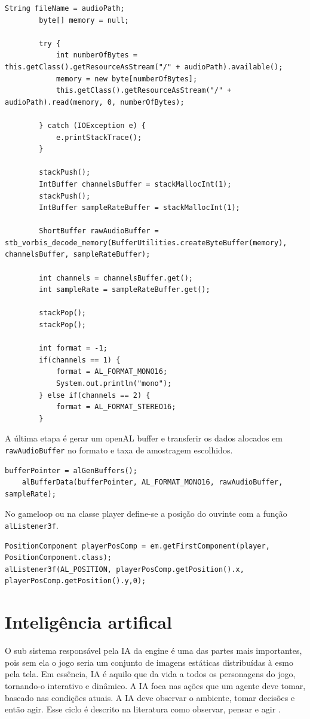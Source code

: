 \documentclass[12pt, 
openright, 
oneside, 
a4paper,    
brazil]{facom-ufu-abntex2}
\begin{document}
\begin{lstlisting}[caption=Leitura do arquivo de aúdio]
        String fileName = audioPath;
        byte[] memory = null;
         
        try {
            int numberOfBytes = this.getClass().getResourceAsStream("/" + audioPath).available();
            memory = new byte[numberOfBytes];
            this.getClass().getResourceAsStream("/" + audioPath).read(memory, 0, numberOfBytes);
             
        } catch (IOException e) {
            e.printStackTrace();
        }
 
        stackPush();
        IntBuffer channelsBuffer = stackMallocInt(1);
        stackPush();
        IntBuffer sampleRateBuffer = stackMallocInt(1);

        ShortBuffer rawAudioBuffer = stb_vorbis_decode_memory(BufferUtilities.createByteBuffer(memory), channelsBuffer, sampleRateBuffer);
 
        int channels = channelsBuffer.get();
        int sampleRate = sampleRateBuffer.get();

        stackPop();
        stackPop();
 
        int format = -1;
        if(channels == 1) {
            format = AL_FORMAT_MONO16;
            System.out.println("mono");
        } else if(channels == 2) {
            format = AL_FORMAT_STEREO16;
        }
\end{lstlisting}

A última etapa é gerar um openAL buffer e transferir os dados alocados em \texttt{rawAudioBuffer} no formato e taxa de amostragem escolhidos.
\begin{lstlisting}[caption=OpenAL Buffers]
    bufferPointer = alGenBuffers();
    alBufferData(bufferPointer, AL_FORMAT_MONO16, rawAudioBuffer, sampleRate);
\end{lstlisting}

No gameloop ou na classe player define-se a posição do ouvinte com a função \texttt{alListener3f}.

\begin{lstlisting}[caption=OpenAL Listener]
PositionComponent playerPosComp = em.getFirstComponent(player, PositionComponent.class);
alListener3f(AL_POSITION, playerPosComp.getPosition().x, playerPosComp.getPosition().y,0);
\end{lstlisting}

\chapter{Inteligência artifical}
O sub sistema responsável pela IA da engine é uma das partes mais importantes, pois sem ela o jogo seria um conjunto de imagens estáticas distribuídas à esmo pela tela.
Em essência, IA é aquilo que da vida a todos os personagens do jogo, tornando-o interativo e dinâmico.
A IA foca nas ações que um agente deve tomar, baseado nas condições atuais. A IA deve observar o ambiente, tomar decisões e então agir. Esse ciclo é descrito na literatura como observar, pensar e agir \cite{GameDevAI}.
\end{document}

